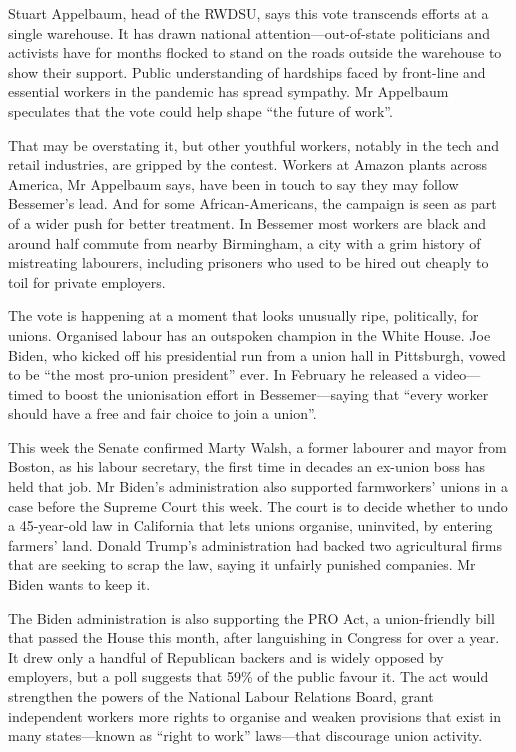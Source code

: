 \documentclass{article}
\begin{document}
Stuart Appelbaum, head of the RWDSU, says this vote transcends efforts at a single warehouse. It has drawn national attention---out-of-state politicians and activists have for months flocked to stand on the roads outside the warehouse to show their support. Public understanding of hardships faced by front-line and essential workers in the pandemic has spread sympathy. Mr Appelbaum speculates that the vote could help shape ``the future of work''. 

That may be overstating it, but other youthful workers, notably in the tech and retail industries, are gripped by the contest. Workers at Amazon plants across America, Mr Appelbaum says, have been in touch to say they may follow Bessemer's lead. And for some African-Americans, the campaign is seen as part of a wider push for better treatment. In Bessemer most workers are black and around half commute from nearby Birmingham, a city with a grim history of mistreating labourers, including prisoners who used to be hired out cheaply to toil for private employers. 

The vote is happening at a moment that looks unusually ripe, politically, for unions. Organised labour has an outspoken champion in the White House. Joe Biden, who kicked off his presidential run from a union hall in Pittsburgh, vowed to be ``the most pro-union president'' ever. In February he released a video---timed to boost the unionisation effort in Bessemer---saying that ``every worker should have a free and fair choice to join a union''. 

This week the Senate confirmed Marty Walsh, a former labourer and mayor from Boston, as his labour secretary, the first time in decades an ex-union boss has held that job. Mr Biden's administration also supported farmworkers' unions in a case before the Supreme Court this week. The court is to decide whether to undo a 45-year-old law in California that lets unions organise, uninvited, by entering farmers' land. Donald Trump's administration had backed two agricultural firms that are seeking to scrap the law, saying it unfairly punished companies. Mr Biden wants to keep it. 

The Biden administration is also supporting the PRO Act, a union-friendly bill that passed the House this month, after languishing in Congress for over a year. It drew only a handful of Republican backers and is widely opposed by employers, but a poll suggests that 59\% of the public favour it. The act would strengthen the powers of the National Labour Relations Board, grant independent workers more rights to organise and weaken provisions that exist in many states---known as ``right to work'' laws---that discourage union activity. 
\end{document}
